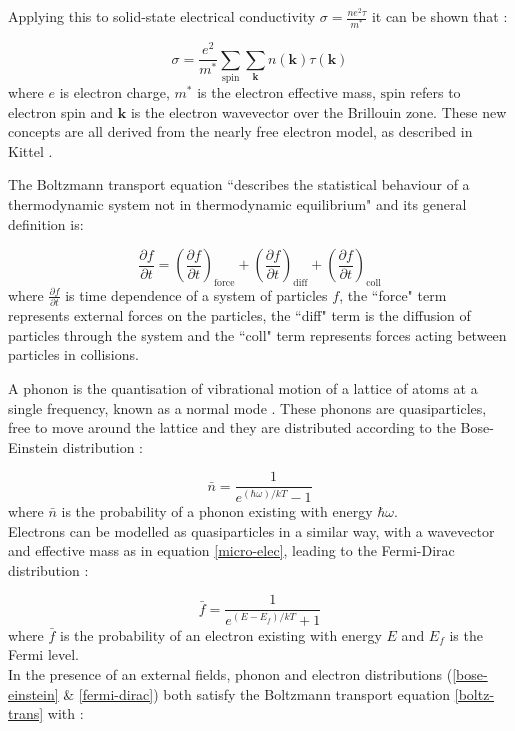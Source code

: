 \documentclass[12pt,titlepage,draft]{article}
\renewcommand{\vec}[1]{\mathbf{#1}}
\begin{document}
Applying this to solid-state electrical conductivity $\sigma = \frac{ne^2
\tau}{m^*}$ it can be shown that \cite{ziman}:

\begin{equation}
\label{micro-elec}
	\sigma = \frac{e^2}{m^*} \sum_{\mathrm{spin}} \sum_{\vec{k}}
	n(\vec{k}) \tau(\vec{k})
\end{equation}
where $e$ is electron charge, $m^*$ is the electron effective mass, $\mathrm{spin}$ refers to
electron spin and $\vec{k}$ is the electron wavevector over the
Brillouin zone. These new concepts are all derived from the nearly free electron
model, as described in Kittel \cite{kittel}.

The Boltzmann transport equation ``describes the statistical behaviour
of a thermodynamic system not in thermodynamic equilibrium"
\cite{wiki-boltz} and its general definition is:

\begin{equation}
\label{boltz-trans}
	\frac{\partial f}{\partial t} = \left(\frac{\partial f}{\partial
	t}\right)_\mathrm{force} + \left(\frac{\partial f}{\partial t}\right)_\mathrm{diff}+ \left(\frac{\partial f}{\partial t}\right)_\mathrm{coll}
\end{equation}
where $\frac{\partial f}{\partial t}$ is time dependence of a system
of particles $f$, the ``force" term represents external forces on the
particles, the ``diff" term is the diffusion of particles through the
system and the ``coll" term represents forces acting between particles
in collisions.

A phonon is the quantisation of vibrational motion of a lattice of
atoms at a single frequency, known as a normal mode \cite{kittel}. These phonons are
quasiparticles, free to move around the lattice and they are
distributed according to the Bose-Einstein distribution \cite{kittel}:

\begin{equation}
\label{bose-einstein}
	 \bar{n} = \frac{1}{e^{(\hbar \omega) / k T} - 1}
\end{equation}
where $\bar{n}$ is the probability of a phonon existing with energy
$\hbar \omega$.\\
Electrons can be modelled as quasiparticles in a similar way, with a
wavevector and effective mass as in equation \eqref{micro-elec},
leading to the Fermi-Dirac distribution \cite{kittel}:

\begin{equation}
\label{fermi-dirac}
	 \bar{f} = \frac{1}{e^{(E - E_f) / k T} + 1}
\end{equation}
where $\bar{f}$ is the probability of an electron existing with energy
$E$ and $E_f$ is the Fermi level.\\
In the presence of an external fields, phonon and electron
distributions (\eqref{bose-einstein} \& \eqref{fermi-dirac}) both
satisfy the Boltzmann transport equation \eqref{boltz-trans} with
\cite{ziman}:
\end{document}
